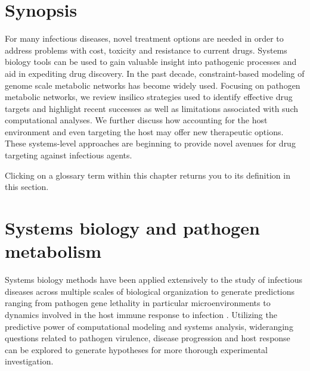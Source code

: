 

\section{Synopsis}
For many infectious diseases, novel treatment options are needed 
in order to address problems with cost, toxicity and resistance to 
current drugs. Systems biology tools can be used to gain valuable 
insight into pathogenic processes and aid in expediting drug discovery. 
In the past decade, constraint-based modeling of genome scale 
metabolic networks has become widely used. Focusing on pathogen 
metabolic networks, we review \gls{insilico} strategies used to identify 
effective drug targets and highlight recent successes as well as 
limitations associated with such computational analyses. We further 
discuss how accounting for the host environment and even targeting the 
host may offer new therapeutic options. These systems-level approaches 
are beginning to provide novel avenues for drug targeting against 
infectious agents.

\printglossary
Clicking on a glossary term within this chapter returns you to its definition in this section.


\section{Systems biology and pathogen metabolism}
Systems biology methods have been applied extensively to the 
study of infectious diseases across multiple scales of 
biological organization to generate predictions ranging from pathogen 
gene lethality in particular microenvironments 
\cite{Jamshidi:2007ei,Fang:2010gc} to dynamics 
involved in the host immune response to infection \cite{SegoviaJuarez:2004bn}. Utilizing 
the predictive power of computational modeling and systems analysis, 
wideranging questions related to pathogen virulence, disease 
progression and host response can be explored to generate hypotheses 
for more thorough experimental investigation.

